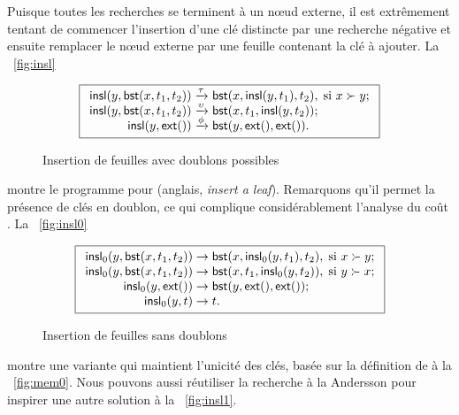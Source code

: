 Puisque toutes les recherches se terminent à un n{\oe}ud externe, il
est extrêmement tentant de commencer l'insertion d'une clé distincte
par une recherche négative et ensuite remplacer le n{\oe}ud externe
par une feuille contenant la clé à ajouter. La \fig~\vref{fig:insl}
\begin{figure}[b]
\begin{equation*}
\boxed{
\begin{array}{r@{\;}l@{\;}l}
\fun{insl}(y,\fun{bst}(x,t_1,t_2)) & \xrightarrow{\smash{\tau}} &
  \fun{bst}(x,\fun{insl}(y,t_1),t_2), \; \text{si \(x \succ y\)};\\
\fun{insl}(y,\fun{bst}(x,t_1,t_2)) & \xrightarrow{\smash{\upsilon}} &
  \fun{bst}(x,t_1,\fun{insl}(y,t_2));\\
\fun{insl}(y,\fun{ext}()) & \xrightarrow{\smash{\phi}} & \fun{bst}(y,\fun{ext}(),\fun{ext}()).
\end{array}}
\end{equation*}
\caption{Insertion de feuilles avec doublons possibles}
\label{fig:insl}
\end{figure}
montre le programme pour 
(anglais, \emph{insert a leaf}). Remarquons qu'il permet la présence
de clés en doublon, ce qui complique considérablement l'analyse du
coût \citep{Burge_1976,ArchibaldClement_2006,Pasanen_2010}.  La
\fig~\vref{fig:insl0}
\begin{figure}
\begin{equation*}
\boxed{
\begin{array}{r@{\;}l@{\;}l}
\fun{insl}_0(y,\fun{bst}(x,t_1,t_2)) & \rightarrow &
  \fun{bst}(x,\fun{insl}_0(y,t_1),t_2), \; \text{si \(x \succ y\)};\\
\fun{insl}_0(y,\fun{bst}(x,t_1,t_2)) & \rightarrow &
  \fun{bst}(x,t_1,\fun{insl}_0(y,t_2)) , \; \text{si \(y \succ x\)};\\
\fun{insl}_0(y,\fun{ext}()) & \rightarrow &
\fun{bst}(y,\fun{ext}(),\fun{ext}());\\
\fun{insl}_0(y,t) & \rightarrow & t.
\end{array}}
\end{equation*}
\caption{Insertion de feuilles sans doublons}
\label{fig:insl0}
\end{figure}
montre une variante qui maintient l'unicité des clés, basée sur la
définition de  à la
\fig~\vref{fig:mem0}. Nous pouvons aussi réutiliser la recherche à la
Andersson pour inspirer une autre solution à la
\fig~\vref{fig:insl1}.
